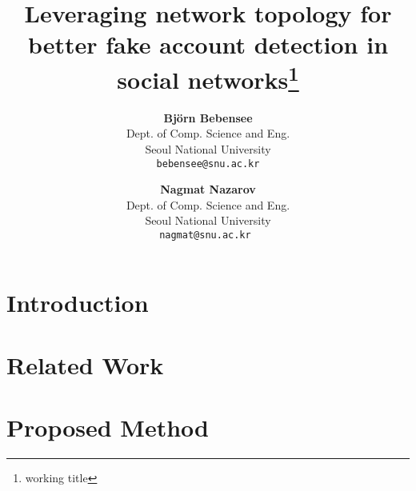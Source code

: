 \documentclass[12pt]{article}
\makeatletter
\let\oldabstract\abstract
\let\oldendabstract\endabstract
\renewenvironment{abstract}
{\renewenvironment{quotation}%
               {\list{}{\addtolength{\leftmargin}{3em} %
                        \listparindent 1.5em%
                        \itemindent    \listparindent%
                        \rightmargin   \leftmargin%
                        \parsep        \z@ \@plus\p@}%
                \item\relax}%
               {\endlist}%
\oldabstract}
{\oldendabstract}
\makeatother
\begin{document}
\newcommand{\beq}{\begin{equation}}
\newcommand{\eeq}{\end{equation}}
\newcommand{\bit}{\begin{itemize*}}
\newcommand{\eit}{\end{itemize*}}
\newcommand{\goal}[1]{ {\noindent {$\Rightarrow$} \em {#1} } }
\newcommand{\hide}[1]{}
\newcommand{\comment}[1]{ {\footnotesize {#1} } }
\newtheorem{lemma}{Lemma}
\newtheorem{theorem}{Theorem}
\newtheorem{proof}{Proof}
\newtheorem{defn}{Definition}
\newtheorem{algo}{Algorithm}
\newtheorem{observation}{Observation}

\title{Leveraging network topology for better fake account detection in social networks\footnote{working title}}


\author{ {\bf Björn Bebensee} \\
	    Dept. of Comp. Science and Eng.\\
	    Seoul National University\\
	    {\tt bebensee@snu.ac.kr}
	 \and
	 {\bf Nagmat Nazarov} \\
	     Dept. of Comp. Science and Eng.\\
	     Seoul National University \\
	     {\tt nagmat@snu.ac.kr }
        }
\date{}

\maketitle
\begin{abstract}
    
\end{abstract}

\section{Introduction}
    \label{sec:intro}
    

\section{Related Work}
    \label{sec:survey}
    


\section{Proposed Method}
    \label{sec:proposed}
    
\end{document}
